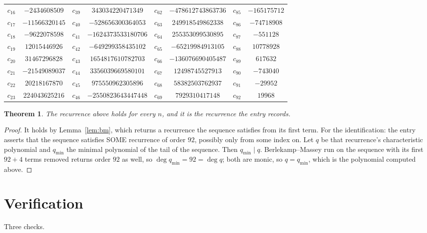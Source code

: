 \documentclass[11pt,a4paper]{article}
\theoremstyle{plain}
\newtheorem{theorem}{Theorem}
\theoremstyle{definition}
\begin{document}
\begin{center}
\begin{tabular}{cccccccc}
$c_{16}$ & $-2434608509$ & $c_{39}$ & $343034220471349$ & $c_{62}$ & $-478612743863736$ & $c_{85}$ & $-165175712$ \\
$c_{17}$ & $-11566320145$ & $c_{40}$ & $-528656300364053$ & $c_{63}$ & $249918549862338$ & $c_{86}$ & $-74718908$ \\
$c_{18}$ & $-9622078598$ & $c_{41}$ & $-1624373533180706$ & $c_{64}$ & $255353099530895$ & $c_{87}$ & $-551128$ \\
$c_{19}$ & $12015446926$ & $c_{42}$ & $-649299358435102$ & $c_{65}$ & $-65219984913105$ & $c_{88}$ & $10778928$ \\
$c_{20}$ & $31467296828$ & $c_{43}$ & $1654817610782703$ & $c_{66}$ & $-136076690405487$ & $c_{89}$ & $617632$ \\
$c_{21}$ & $-21549089037$ & $c_{44}$ & $3356039669580101$ & $c_{67}$ & $12498745527913$ & $c_{90}$ & $-743040$ \\
$c_{22}$ & $20218167870$ & $c_{45}$ & $975550962305896$ & $c_{68}$ & $58382503762937$ & $c_{91}$ & $-29952$ \\
$c_{23}$ & $224043625216$ & $c_{46}$ & $-2550823643447448$ & $c_{69}$ & $7929310417148$ & $c_{92}$ & $19968$ \\
\end{tabular}
\end{center}

\begin{theorem}
The recurrence above holds for every $n$, and it is the recurrence the entry records.
\end{theorem}

\begin{proof}
It holds by Lemma~\ref{lem:bm}, which returns a recurrence the sequence satisfies from its
first term. For the identification: the entry asserts that the sequence satisfies SOME
recurrence of order $92$, possibly only from some index on. Let $q$ be that recurrence's
characteristic polynomial and $q_{\min}$ the minimal polynomial of the tail of the sequence.
Then $q_{\min}\mid q$. Berlekamp--Massey run on the sequence with its first $92+4$ terms
removed returns order $92$ as well, so $\deg q_{\min}=92=\deg q$; both are monic, so
$q=q_{\min}$, which is the polynomial computed above.
\end{proof}

\section{Verification}

Three checks.
\end{document}
